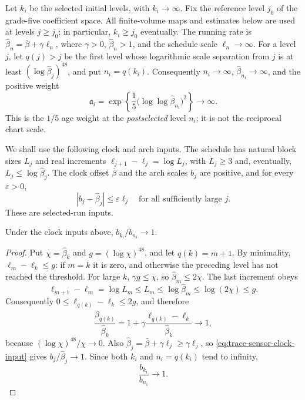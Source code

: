 Let $k_i$ be the selected initial levels, with $k_i\to\infty$. Fix the
reference level $j_0$ of the grade-five coefficient space. All finite-volume
maps and estimates below are used at levels $j\ge j_0$; in particular,
$k_i\ge j_0$ eventually. The running rate is
$\widehat\beta_n=\bar\beta+\gamma\ell_n$, where $\gamma>0$,
$\widehat\beta_n>1$, and the schedule scale $\ell_n\to\infty$. For a level
$j$, let $q(j)>j$ be the first level whose logarithmic scale separation from
$j$ is at least $(\log\widehat\beta_j)^{48}$, and put $n_i=q(k_i)$.
Consequently $n_i\to\infty$,
$\widehat\beta_{n_i}\to\infty$, and the positive weight
\begin{equation}
 \mathfrak a_i=\exp\!\left\{\frac15\bigl(\log\log\widehat\beta_{n_i}\bigr)^2\right\}
 \longrightarrow\infty.
 \label{eq:trace-sensor-weight}
\end{equation}
This is the $1/5$ age weight at the \emph{postselected} level $n_i$;
it is not the reciprocal chart scale.

We shall use the following clock and arch inputs. The schedule has natural
block sizes $L_j$ and real increments $\ell_{j+1}-\ell_j=\log L_j$, with
$L_j\ge3$ and, eventually,
$L_j\le\log\widehat\beta_j$. The clock offset $\bar\beta$ and the arch
scales $b_j$ are positive, and for every $\varepsilon>0$,
\begin{equation}
 |b_j-\widehat\beta_j|\le\varepsilon\ell_j
 \quad\text{for all sufficiently large }j.
 \label{eq:trace-sensor-clock-input}
\end{equation}
These are selected-run inputs.

\begin{lemma}\label{lem:trace-sensor-arch-ratio}
Under the clock inputs above, $b_{k_i}/b_{n_i}\to1$.
\end{lemma}
\nopagebreak
\begin{proof}
Put
$\chi=\widehat\beta_k$ and $g=(\log \chi)^{48}$, and let $q(k)=m+1$.
By minimality, $\ell_m-\ell_k\le g$: if $m=k$ it is zero, and otherwise
the preceding level has not reached the threshold. For large $k$,
$\gamma g\le \chi$, so $\widehat\beta_m\le2\chi$. The last increment obeys
\[
 \ell_{m+1}-\ell_m=\log L_m\le L_m
 \le\log\widehat\beta_m\le\log(2\chi)\le g.
\]
Consequently $0\le\ell_{q(k)}-\ell_k\le2g$, and therefore
\[
 \frac{\widehat\beta_{q(k)}}{\widehat\beta_k}
 =1+\gamma\frac{\ell_{q(k)}-\ell_k}{\widehat\beta_k}
 \longrightarrow1,
\]
because $(\log \chi)^{48}/\chi\to0$. Also
$\widehat\beta_j=\bar\beta+\gamma\ell_j\ge\gamma\ell_j$, so
\eqref{eq:trace-sensor-clock-input} gives $b_j/\widehat\beta_j\to1$.
Since both $k_i$ and $n_i=q(k_i)$ tend to infinity,
\begin{equation}
 \frac{b_{k_i}}{b_{n_i}}\longrightarrow1.
 \label{eq:trace-sensor-arch-ratio}
\end{equation}
\end{proof}

